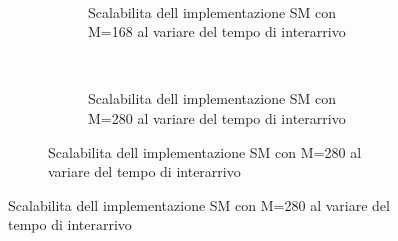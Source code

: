 \begin{figure}[p]
\begin{subfigure}[b]{.5\columnwidth}
\begin{subfigure}[b]{\textwidth}
    \end{subfigure}
    ~
    \begin{subfigure}[b]{\textwidth}
      \centering
      \addtocounter{subfigure}{-1}
      \renewcommand\thesubfigure{\alph{subfigure}2}
      \resizebox{\columnwidth}{!}{}
      \caption{Scalabilita dell implementazione SM con M=168 al variare del tempo di interarrivo}
      \label{fig:scalability_SM_size168}
    \end{subfigure}
    ~
    \begin{subfigure}[b]{\textwidth}
      \centering
      \addtocounter{subfigure}{-1}
      \renewcommand\thesubfigure{\alph{subfigure}3}
      \resizebox{\columnwidth}{!}{}
      \caption{Scalabilita dell implementazione SM con M=280 al variare del tempo di interarrivo}
      \label{fig:scalability_SM_size280}
    \end{subfigure}
    \label{fig:allscalability_SM}
  \end{subfigure}
\end{figure}




\FloatBarrier


